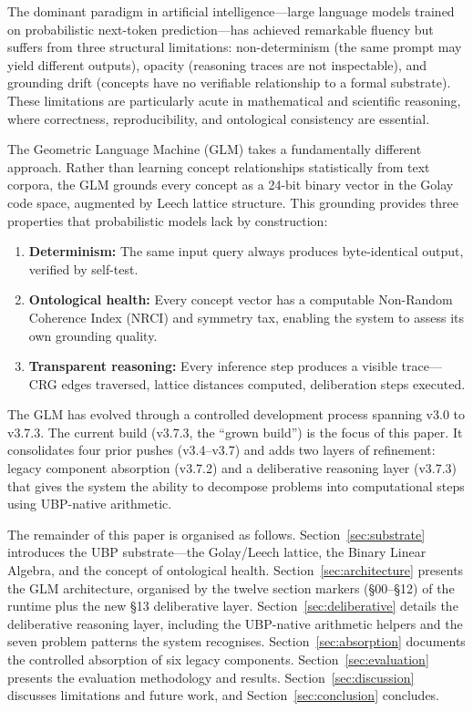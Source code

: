 \documentclass[11pt,a4paper]{article}
\begin{document}
The dominant paradigm in artificial intelligence---large language models trained on probabilistic next-token prediction---has achieved remarkable fluency but suffers from three structural limitations: non-determinism (the same prompt may yield different outputs), opacity (reasoning traces are not inspectable), and grounding drift (concepts have no verifiable relationship to a formal substrate). These limitations are particularly acute in mathematical and scientific reasoning, where correctness, reproducibility, and ontological consistency are essential.

The Geometric Language Machine (GLM) takes a fundamentally different approach. Rather than learning concept relationships statistically from text corpora, the GLM grounds every concept as a 24-bit binary vector in the Golay code space, augmented by Leech lattice structure. This grounding provides three properties that probabilistic models lack by construction:

\begin{enumerate}[label=(\roman*)]
    \item \textbf{Determinism:} The same input query always produces byte-identical output, verified by self-test.
    \item \textbf{Ontological health:} Every concept vector has a computable Non-Random Coherence Index (NRCI) and symmetry tax, enabling the system to assess its own grounding quality.
    \item \textbf{Transparent reasoning:} Every inference step produces a visible trace---CRG edges traversed, lattice distances computed, deliberation steps executed.
\end{enumerate}

The GLM has evolved through a controlled development process spanning v3.0 to v3.7.3. The current build (v3.7.3, the ``grown build'') is the focus of this paper. It consolidates four prior pushes (v3.4--v3.7) and adds two layers of refinement: legacy component absorption (v3.7.2) and a deliberative reasoning layer (v3.7.3) that gives the system the ability to decompose problems into computational steps using UBP-native arithmetic.

The remainder of this paper is organised as follows. Section~\ref{sec:substrate} introduces the UBP substrate---the Golay/Leech lattice, the Binary Linear Algebra, and the concept of ontological health. Section~\ref{sec:architecture} presents the GLM architecture, organised by the twelve section markers (\S00--\S12) of the runtime plus the new \S13 deliberative layer. Section~\ref{sec:deliberative} details the deliberative reasoning layer, including the UBP-native arithmetic helpers and the seven problem patterns the system recognises. Section~\ref{sec:absorption} documents the controlled absorption of six legacy components. Section~\ref{sec:evaluation} presents the evaluation methodology and results. Section~\ref{sec:discussion} discusses limitations and future work, and Section~\ref{sec:conclusion} concludes.
\end{document}
